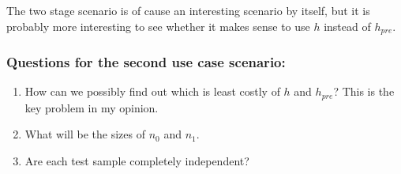 \documentclass{article}
\theoremstyle{theorem}
\theoremstyle{definition}
\newcommand{\bv}[1]{\bm{#1}}
\begin{document}
The two stage scenario is of cause an interesting scenario by itself, but it is probably more interesting to see whether it makes sense to use $h$ instead of $h_{pre}$.  

%
%



\subsubsection*{Questions for the second use case scenario: }
\begin{enumerate}
\item How can we possibly find out which is least costly of $h$ and $h_{pre}$? This is the key problem in my opinion.
\item What will be the sizes of $n_0$ and $n_1$.
\item Are each test sample completely independent?
\end{enumerate}
\end{document}
